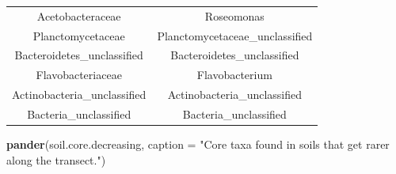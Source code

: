 \documentclass[]{article}
\newenvironment{Shaded}{\begin{snugshade}}{\end{snugshade}}
\newcommand{\DataTypeTok}[1]{\textcolor[rgb]{0.13,0.29,0.53}{#1}}
\newcommand{\KeywordTok}[1]{\textcolor[rgb]{0.13,0.29,0.53}{\textbf{#1}}}
\newcommand{\NormalTok}[1]{#1}
\newcommand{\StringTok}[1]{\textcolor[rgb]{0.31,0.60,0.02}{#1}}
\begin{document}
\begin{longtable}[]{@{}cc@{}}
\begin{minipage}[t]{0.41\columnwidth}\centering
Acetobacteraceae\strut
\end{minipage} & \begin{minipage}[t]{0.43\columnwidth}\centering
Roseomonas\strut
\end{minipage}\tabularnewline
\begin{minipage}[t]{0.41\columnwidth}\centering
Planctomycetaceae\strut
\end{minipage} & \begin{minipage}[t]{0.43\columnwidth}\centering
Planctomycetaceae\_unclassified\strut
\end{minipage}\tabularnewline
\begin{minipage}[t]{0.41\columnwidth}\centering
Bacteroidetes\_unclassified\strut
\end{minipage} & \begin{minipage}[t]{0.43\columnwidth}\centering
Bacteroidetes\_unclassified\strut
\end{minipage}\tabularnewline
\begin{minipage}[t]{0.41\columnwidth}\centering
Flavobacteriaceae\strut
\end{minipage} & \begin{minipage}[t]{0.43\columnwidth}\centering
Flavobacterium\strut
\end{minipage}\tabularnewline
\begin{minipage}[t]{0.41\columnwidth}\centering
Actinobacteria\_unclassified\strut
\end{minipage} & \begin{minipage}[t]{0.43\columnwidth}\centering
Actinobacteria\_unclassified\strut
\end{minipage}\tabularnewline
\begin{minipage}[t]{0.41\columnwidth}\centering
Bacteria\_unclassified\strut
\end{minipage} & \begin{minipage}[t]{0.43\columnwidth}\centering
Bacteria\_unclassified\strut
\end{minipage}\tabularnewline
\bottomrule
\end{longtable}

\begin{Shaded}
\begin{Highlighting}[]
\KeywordTok{pander}\NormalTok{(soil.core.decreasing, }\DataTypeTok{caption =} \StringTok{"Core taxa found in soils that get rarer along the transect."}\NormalTok{)}
\end{Highlighting}
\end{Shaded}
\end{document}
